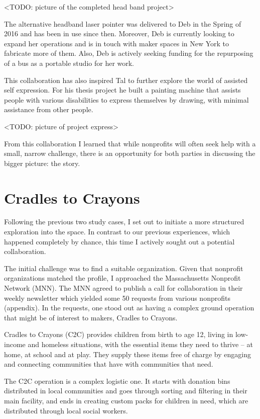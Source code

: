 <TODO: picture of the completed head band project>

The alternative headband laser pointer was delivered to Deb in the Spring of 2016 and has been in use since then. Moreover, Deb is currently looking to expand her operations and is in touch with maker spaces in New York to fabricate more of them. Also, Deb is actively seeking funding for the repurposing of a bus as a portable studio for her work. 

This collaboration has also inspired Tal to further explore the world of assisted self expression.  For his thesis project he built a painting machine that assists people with various disabilities to express themselves by drawing, with minimal assistance from other people\cite{projexpress}. 

<TODO: picture of project express>

From this collaboration I learned that while nonprofits will often seek help with a small, narrow challenge, there is an opportunity for both parties in discussing the bigger picture: the story. 

\section{Cradles to Crayons}

Following the previous two study cases, I set out to initiate a more structured exploration into the space. In contrast to our previous experiences, which happened completely by chance, this time I actively sought out a potential collaboration. 

The initial challenge was to find a suitable organization. Given that nonprofit organizations matched the profile, I approached the Massachusetts Nonprofit Network (MNN). The MNN agreed to publish a call for collaboration in their weekly newsletter which yielded some 50 requests from various nonprofits (appendix). In the requests, one stood out as having a complex ground operation that might be of interest to makers, Cradles to Crayons.   

Cradles to Crayons (C2C) provides children from birth to age 12, living in low-income and homeless situations, with the essential items they need to thrive – at home, at school and at play. They supply these items free of charge by engaging and connecting communities that have with communities that need.

The C2C operation is a complex logistic one. It starts with donation bins distributed in local communities and goes through sorting and filtering in their main facility, and ends in creating custom packs for children in need, which are distributed through local social workers. 

